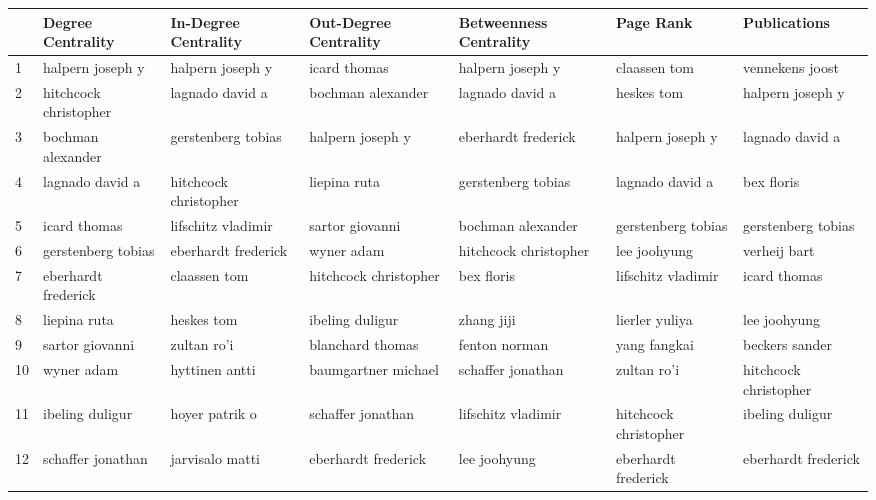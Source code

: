 \documentclass[11pt,a4paper]{book}
\theoremstyle{definition}
\theoremstyle{definition}
\theoremstyle{definition}
\theoremstyle{remark}
\begin{document}
\begin{table}
\centering
\scriptsize
\begin{tabular}{lllllll}
\toprule
{} &     Degree Centrality &    In-Degree Centrality &   Out-Degree Centrality &  Betweenness Centrality &   Page Rank & Publications \\
\midrule
1  &       halpern joseph y &       halpern joseph y &           icard thomas &       halpern joseph y &           claassen tom &        vennekens joost \\
2  &  hitchcock christopher &        lagnado david a &      bochman alexander &        lagnado david a &             heskes tom &       halpern joseph y \\
3  &      bochman alexander &     gerstenberg tobias &       halpern joseph y &    eberhardt frederick &       halpern joseph y &        lagnado david a \\
4  &        lagnado david a &  hitchcock christopher &           liepina ruta &     gerstenberg tobias &        lagnado david a &             bex floris \\
5  &           icard thomas &     lifschitz vladimir &        sartor giovanni &      bochman alexander &     gerstenberg tobias &     gerstenberg tobias \\
6  &     gerstenberg tobias &    eberhardt frederick &             wyner adam &  hitchcock christopher &           lee joohyung &           verheij bart \\
7  &    eberhardt frederick &           claassen tom &  hitchcock christopher &             bex floris &     lifschitz vladimir &           icard thomas \\
8  &           liepina ruta &             heskes tom &        ibeling duligur &             zhang jiji &         lierler yuliya &           lee joohyung \\
9  &        sartor giovanni &            zultan ro'i &       blanchard thomas &          fenton norman &           yang fangkai &         beckers sander \\
10  &             wyner adam &         hyttinen antti &    baumgartner michael &      schaffer jonathan &            zultan ro'i &  hitchcock christopher \\
11 &        ibeling duligur &         hoyer patrik o &      schaffer jonathan &     lifschitz vladimir &  hitchcock christopher &        ibeling duligur \\
12 &      schaffer jonathan &        jarvisalo matti &    eberhardt frederick &           lee joohyung &    eberhardt frederick &    eberhardt frederick \\

\end{tabular}
\end{table}
\end{document}
